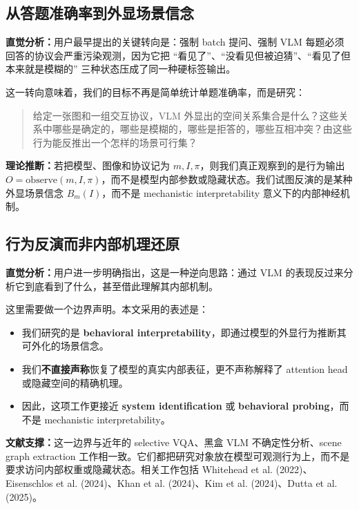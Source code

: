 \documentclass[11pt,a4paper]{ctexart}
\newcommand{\intuition}[1]{\textbf{直觉分析：}#1}
\newcommand{\evidence}[1]{\textbf{文献支撑：}#1}
\newcommand{\theorynote}[1]{\textbf{理论推断：}#1}
\begin{document}
\subsection{从答题准确率到外显场景信念}

\intuition{用户最早提出的关键转向是：强制 batch 提问、强制 VLM 每题必须回答的协议会严重污染观测，因为它把 ``看见了''、``没看见但被迫猜''、``看见了但本来就是模糊的'' 三种状态压成了同一种硬标签输出。}

这一转向意味着，我们的目标不再是简单统计单题准确率，而是研究：

\begin{quote}
给定一张图和一组交互协议，VLM 外显出的空间关系集合是什么？这些关系中哪些是确定的，哪些是模糊的，哪些是拒答的，哪些互相冲突？由这些行为能反推出一个怎样的场景可行集？
\end{quote}

\theorynote{若把模型、图像和协议记为 $m, I, \pi$，则我们真正观察到的是行为输出 $O = \mathrm{observe}(m, I, \pi)$，而不是模型内部参数或隐藏状态。我们试图反演的是某种外显场景信念 $B_m(I)$，而不是 mechanistic interpretability 意义下的内部神经机制。}

\subsection{行为反演而非内部机理还原}

\intuition{用户进一步明确指出，这是一种逆向思路：通过 VLM 的表现反过来分析它到底看到了什么，甚至借此理解其内部机制。}

这里需要做一个边界声明。本文采用的表述是：

\begin{itemize}
  \item 我们研究的是 \textbf{behavioral interpretability}，即通过模型的外显行为推断其可外化的场景信念。
  \item 我们\textbf{不直接声称}恢复了模型的真实内部表征，更不声称解释了 attention head 或隐藏空间的精确机理。
  \item 因此，这项工作更接近 \textbf{system identification} 或 \textbf{behavioral probing}，而不是 mechanistic interpretability。
\end{itemize}

\evidence{这一边界与近年的 selective VQA、黑盒 VLM 不确定性分析、scene graph extraction 工作相一致。它们都把研究对象放在模型可观测行为上，而不是要求访问内部权重或隐藏状态。相关工作包括 Whitehead et al. (2022)、Eisenschlos et al. (2024)、Khan et al. (2024)、Kim et al. (2024)、Dutta et al. (2025)。}
\end{document}
